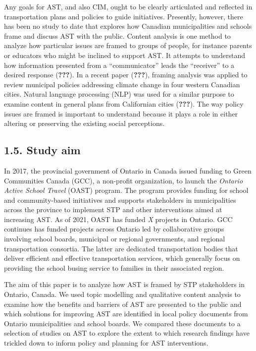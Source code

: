 \documentclass[]{elsarticle} %
\begin{document}
Any goals for AST, and also CIM, ought to be clearly articulated and
reflected in transportation plans and policies to guide initiatives.
Presently, however, there has been no study to date that explores how
Canadian municipalities and schools frame and discuss AST with the
public. Content analysis is one method to analyze how particular issues
are framed to groups of people, for instance parents or educators who
might be inclined to support AST. It attempts to understand how
information presented from a ``communicator'' leads the ``receiver'' to
a desired response ({\textbf{???}}). In a recent paper ({\textbf{???}}),
framing analysis was applied to review municipal policies addressing
climate change in four western Canadian cities. Natural language
processing (NLP) was used for a similar purpose to examine content in
general plans from Californian cities ({\textbf{???}}). The way policy
issues are framed is important to understand because it plays a role in
either altering or preserving the existing social perceptions.

\hypertarget{study-aim}{%
\subsection{1.5. Study aim}\label{study-aim}}

In 2017, the provincial government of Ontario in Canada issued funding
to Green Communities Canada (GCC), a non-profit organization, to launch
the \emph{Ontario Active School Travel} (OAST) program. The program
provides funding for school and community-based initiatives and supports
stakeholders in municipalities across the province to implement STP and
other interventions aimed at increasing AST. As of 2021, OAST has funded
\emph{X} projects in Ontario. GCC continues has funded projects across
Ontario led by collaborative groups involving school boards, municipal
or regional governments, and regional transportation consortia. The
latter are dedicated transportation bodies that deliver efficient and
effective transportation services, which generally focus on providing
the school busing service to families in their associated region.

The aim of this paper is to analyze how AST is framed by STP
stakeholders in Ontario, Canada. We used topic modelling and qualitative
content analysis to examine how the benefits and barriers of AST are
presented to the public and which solutions for improving AST are
identified in local policy documents from Ontario municipalities and
school boards. We compared these documents to a selection of studies on
AST to explore the extent to which research findings have trickled down
to inform policy and planning for AST interventions.
\end{document}
